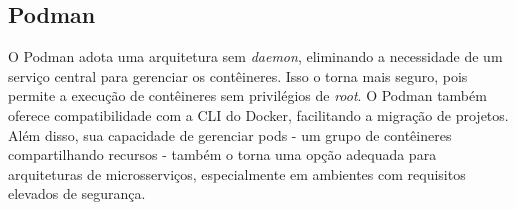 


    
    



\subsection*{Podman}
O Podman adota uma arquitetura sem \emph{daemon}, eliminando a necessidade de um serviço central para gerenciar os contêineres. Isso o torna mais seguro, pois permite a execução de contêineres sem privilégios de \emph{root}. O Podman também oferece compatibilidade com a CLI do Docker, facilitando a migração de projetos. Além disso, sua capacidade de gerenciar pods - um grupo de contêineres compartilhando recursos - também o torna uma opção adequada para arquiteturas de microsserviços, especialmente em ambientes com requisitos elevados de segurança. \cite{podman-vs-docker}

